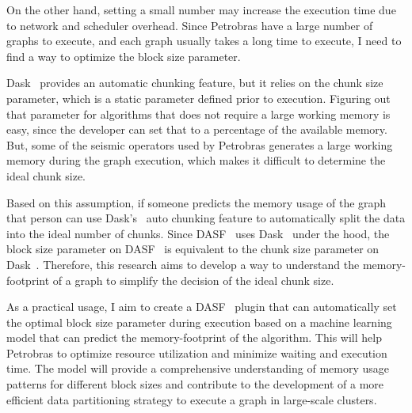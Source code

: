 On the other hand, setting a small number may increase the execution time due to network and scheduler overhead.
Since Petrobras have a large number of graphs to execute, and each graph usually takes a long time to execute, I need to find a way to optimize the block size parameter.

Dask~\cite{dask} provides an automatic chunking feature, but it relies on the chunk size parameter, which is a static parameter defined prior to execution.
Figuring out that parameter for algorithms that does not require a large working memory is easy, since the developer can set that to a percentage of the available memory.
But, some of the seismic operators used by Petrobras generates a large working memory during the graph execution, which makes it difficult to determine the ideal chunk size.

Based on this assumption, if someone predicts the memory usage of the graph that person can use Dask's~\cite{dask} auto chunking feature to automatically split the data into the ideal number of chunks.
Since \ac{DASF}~\cite{dasf} uses Dask~\cite{dask} under the hood, the block size parameter on \ac{DASF}~\cite{dasf} is equivalent to the chunk size parameter on Dask~\cite{dask}.
Therefore, this research aims to develop a way to understand the memory-footprint of a graph to simplify the decision of the ideal chunk size.

As a practical usage, I aim to create a \ac{DASF}~\cite{dasf} plugin that can automatically set the optimal block size parameter during execution based on a machine learning model that can predict the memory-footprint of the algorithm.
This will help Petrobras to optimize resource utilization and minimize waiting and execution time.
The model will provide a comprehensive understanding of memory usage patterns for different block sizes and contribute to the development of a more efficient data partitioning strategy to execute a graph in large-scale clusters.

